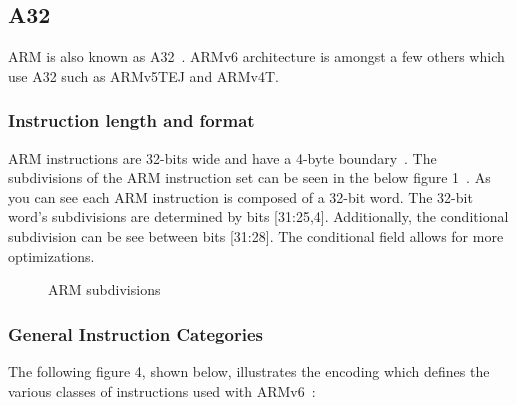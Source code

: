 \documentclass[11pt]{report}
\begin{document}
\subsection{A32}
\begin{onehalfspace}
ARM is also known as A32~\citep{A32}. ARMv6 architecture is amongst a few others which use A32 such as ARMv5TEJ and ARMv4T. 
\subsubsection{ Instruction length and format}
ARM instructions are 32-bits wide and have a 4-byte boundary~\citep{A32}. The subdivisions of the ARM instruction set can be seen in the below figure 1~\citep[A5-2]{referenceB}. As you can see each ARM instruction is composed of a 32-bit word. The 32-bit word's subdivisions are determined by bits [31:25,4]. Additionally, the conditional subdivision can be see between bits [31:28]. The conditional field allows for more optimizations.
\end{onehalfspace}

\begin{center}
\begin{figure}[H] 
\caption{ARM subdivisions}
\end{figure}
\end{center}
\subsubsection{General Instruction Categories}
\begin{onehalfspace}
The following figure 4, shown below, illustrates the encoding which defines the various classes of instructions used with ARMv6~\citep[A5-2]{referenceB}:
\end{onehalfspace}
\end{document}
